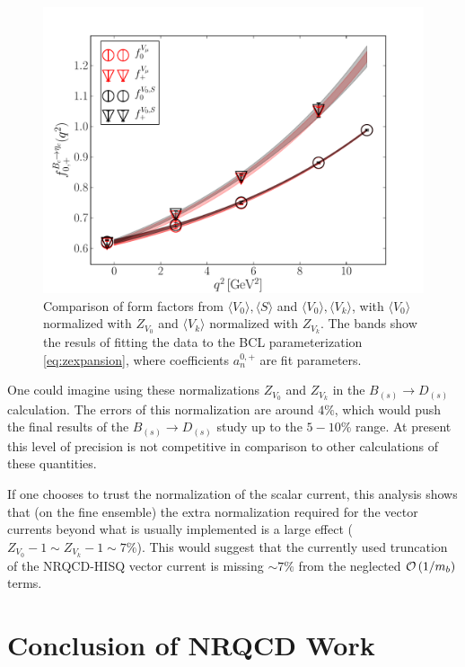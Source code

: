 \begin{figure}[htb!]
\centering
\includegraphics[scale=0.55]{images/nrqcd/Bcetac_bothways_3.pdf}
\caption{Comparison of form factors from $\langle V_0 \rangle, \langle S \rangle$ and $\langle V_0 \rangle,\langle V_k \rangle$, with $\langle V_0 \rangle$ normalized with $Z_{V_0}$ and $\langle V_k \rangle$ normalized with $Z_{V_k}$. The bands show the resuls of fitting the data to the BCL parameterization \eqref{eq:zexpansion}, where coefficients $a^{0,+}_n$ are fit parameters. \label{fig:identicle}}
\end{figure}

One could imagine using these normalizations $Z_{V_0}$ and $Z_{V_k}$ in the $B_{(s)}\to D_{(s)}$ calculation. The errors of this normalization are around $4\%$, which would push the final results of the $B_{(s)}\to D_{(s)}$ study up to the $5-10\%$ range. At present this level of precision is not competitive in comparison to other calculations of these quantities.

If one chooses to trust the normalization of the scalar current, this analysis shows that (on the fine ensemble) the extra normalization required for the vector currents beyond what is usually implemented is a large effect ($Z_{V_0}-1\sim Z_{V_k}-1\sim 7\%$). This would suggest that the currently used truncation of the NRQCD-HISQ vector current is missing $\sim 7\%$ from the neglected $\mathcal{O}\left( 1/m_b \right)$ terms.

\section{Conclusion of NRQCD Work}

